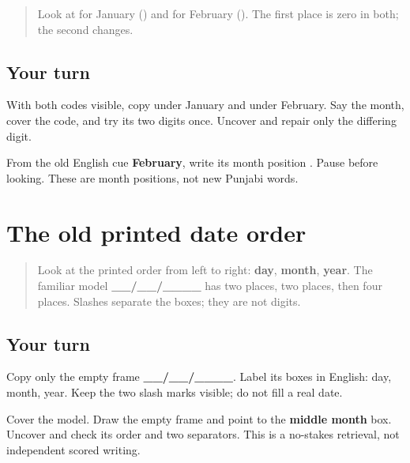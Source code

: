 \label{lesson:PA-R168-month-map-again}



\begin{quote}
Look at \textbf{} for January (\textbf{}) and \textbf{} for February (\textbf{}). The first place is zero in both; the second changes.
\end{quote}

\subsection*{Your turn}
With both codes visible, copy \textbf{} under January and \textbf{} under February. Say the month, cover the code, and try its two digits once. Uncover and repair only the differing digit.

\begin{tcolorbox}[breakable,colback=teal!4,colframe=teal!35!black,title={Before you move on}]
From the old English cue \textbf{February}, write its month position \textbf{}. Pause before looking. These are month positions, not new Punjabi words.
\end{tcolorbox}
\section[\_\_/\_\_/\_\_\_\_ (day/month/year)]{The old printed date order}

\label{lesson:PA-R168-date-format-again}



\begin{quote}
Look at the printed order from left to right: \textbf{day}, \textbf{month}, \textbf{year}. The familiar model \textbf{\_\_/\_\_/\_\_\_\_} has two places, two places, then four places. Slashes separate the boxes; they are not digits.
\end{quote}

\subsection*{Your turn}
Copy only the empty frame \textbf{\_\_/\_\_/\_\_\_\_}. Label its boxes in English: day, month, year. Keep the two slash marks visible; do not fill a real date.

\begin{tcolorbox}[breakable,colback=teal!4,colframe=teal!35!black,title={Before you move on}]
Cover the model. Draw the empty frame and point to the \textbf{middle month} box. Uncover and check its order and two separators. This is a no-stakes retrieval, not independent scored writing.
\end{tcolorbox}
